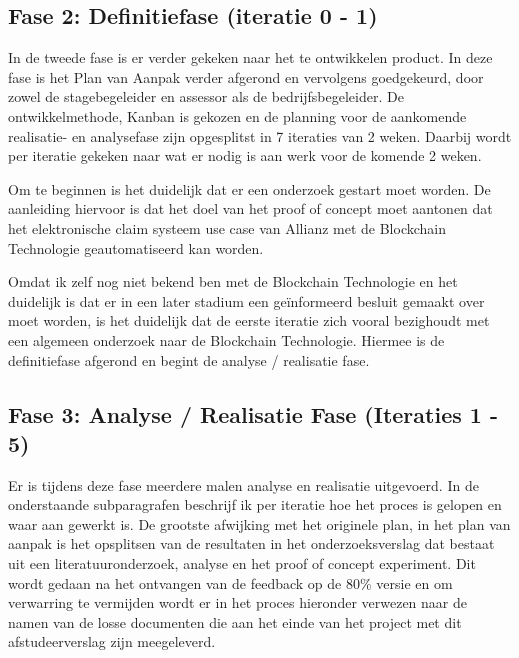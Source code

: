 \subsection{Fase 2: Definitiefase (iteratie 0 - 1)}
In de tweede fase is er verder gekeken naar het te ontwikkelen product. In deze fase is het Plan van Aanpak verder afgerond en vervolgens goedgekeurd, door zowel de stagebegeleider en assessor als de bedrijfsbegeleider. De ontwikkelmethode, Kanban is gekozen en de planning voor de aankomende realisatie- en analysefase zijn opgesplitst in 7 iteraties van 2 weken. Daarbij wordt per iteratie gekeken naar wat er nodig is aan werk voor de komende 2 weken.\par

Om te beginnen is het duidelijk dat er een onderzoek gestart moet worden. De aanleiding hiervoor is dat het doel van het proof of concept moet aantonen dat het elektronische claim systeem use case van Allianz met de Blockchain Technologie geautomatiseerd kan worden.\par

Omdat ik zelf nog niet bekend ben met de Blockchain Technologie en het duidelijk is dat er in een later stadium een geïnformeerd besluit gemaakt over moet worden, is het duidelijk dat de eerste iteratie zich vooral bezighoudt met een algemeen onderzoek naar de Blockchain Technologie. Hiermee is de definitiefase afgerond en begint de analyse / realisatie fase. 

\subsection{Fase 3: Analyse / Realisatie Fase (Iteraties 1 - 5)}
Er is tijdens deze fase meerdere malen analyse en realisatie uitgevoerd. In de onderstaande subparagrafen beschrijf ik per iteratie hoe het proces is gelopen en waar aan gewerkt is. De grootste afwijking met het originele plan, in het plan van aanpak is het opsplitsen van de resultaten in het onderzoeksverslag dat bestaat uit een literatuuronderzoek, analyse en het proof of concept experiment. Dit wordt gedaan na het ontvangen van de feedback op de 80\% versie en om verwarring te vermijden wordt er in het proces hieronder verwezen naar de namen van de losse documenten die aan het einde van het project met dit afstudeerverslag zijn meegeleverd.
\newpage


\newpage

\newpage

\newpage



